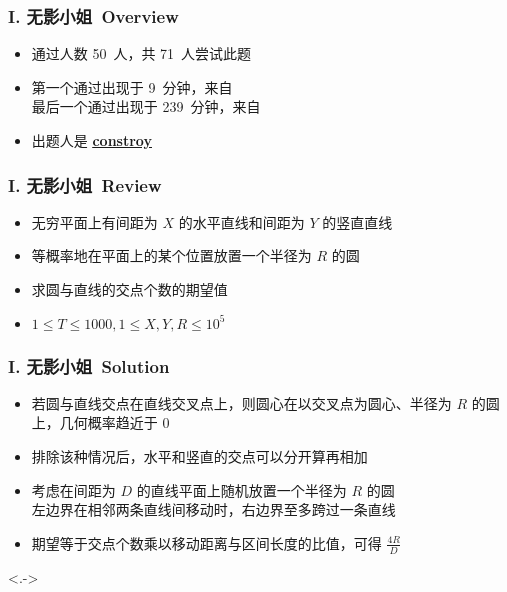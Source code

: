\documentclass[notheorems]{beamer}
\newcommand{\zhProbI}{无影小姐}		\newcommand{\AuthProbI}{\textbf{\underline{\href{http://codeforces.com/profile/constroy}{constroy}}}}
\newcommand{\AccInProbI}{50}	\newcommand{\SubInProbI}{71}	\newcommand{\RatInProbI}{70.42\%}
\newcommand{\FirPenInProbI}{9}		\newcommand{\FirPerInProbI}{\NONE}
\newcommand{\LasPenInProbI}{239}	\newcommand{\LasPerInProbI}{\NONE}
\begin{document}
\begin{frame}[label = ProbI]
\frametitle{I. \zhProbI\ Overview}
\begin{spacing}{2.0} \large
\begin{itemize}[<+->]
\item 通过人数 \AccInProbI\ 人，共 \SubInProbI\ 人尝试此题
\item 第一个通过出现于 \FirPenInProbI\ 分钟，来自 \FirPerInProbI\ 
\\ 最后一个通过出现于 \LasPenInProbI\ 分钟，来自 \LasPerInProbI\ 
\item 出题人是 \AuthProbI\ 
\end{itemize}
\end{spacing}
\end{frame}
\begin{frame}
\frametitle{I. \zhProbI\ Review}
\begin{spacing}{2.0} \large
\begin{itemize}[<+->]
\item 无穷平面上有间距为 $X$ 的水平直线和间距为 $Y$ 的竖直直线
\item \alert{等概率地}在平面上的某个位置放置一个半径为 $R$ 的圆
\item 求圆与直线的交点个数的\alert{期望值}
\item $1 \leq T \leq 1000, 1 \leq X, Y, R \leq 10^5$
\end{itemize}
\end{spacing}
\end{frame}
\begin{frame}
\frametitle{I. \zhProbI\ Solution}
\begin{spacing}{2.0} \large
\begin{itemize}[<+->]
\item 若圆与直线交点在直线交叉点上，则圆心在以交叉点为圆心、半径为 $R$ 的圆上，几何概率趋近于 $0$
\item 排除该种情况后，水平和竖直的交点可以分开算再相加
\item 考虑在间距为 $D$ 的直线平面上随机放置一个半径为 $R$ 的圆 \\ 左边界在相邻两条直线间移动时，右边界\alert{至多跨过一条直线}
\item 期望等于交点个数乘以移动距离与区间长度的比值，可得 $\frac{4 R}{D}$

\end{itemize}
\end{spacing}
\visible<.->{\hyperlink{Overview}{}}
\end{frame}
\end{document}
